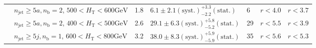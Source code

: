 \begin{table}[h!]
\begin{tabular}{ lllllll }
 & $n_{\mathrm{jet}} \geq5a,n_{\mathrm{b}} =2$, $500 < H_{\mathrm{T}} < 600 \mathrm{GeV}$ & 1.8 & $6.1 \pm 2.1 \mathrm{(syst.)} ^{+3.3}_{-2.2} \mathrm{(stat.)}$ & 6 & $r < 4.0$ & $r < 3.7$\\ 
 & $n_{\mathrm{jet}} \geq5a,n_{\mathrm{b}} =2$, $400 < H_{\mathrm{T}} < 500 \mathrm{GeV}$ & 2.6 & $29.1 \pm 6.3 \mathrm{(syst.)} ^{+5.8}_{-5.2} \mathrm{(stat.)}$ & 29 & $r < 5.5$ & $r < 3.9$\\ 
 & $n_{\mathrm{jet}} \geq5j,n_{\mathrm{b}} =1$, $600 < H_{\mathrm{T}} < 800 \mathrm{GeV}$ & 3.2 & $38.0 \pm 8.3 \mathrm{(syst.)} ^{+5.9}_{-5.9} \mathrm{(stat.)}$ & 35 & $r < 5.6$ & $r < 5.3$\\ \hline
    \hline
  \end{tabular}
\end{table}


